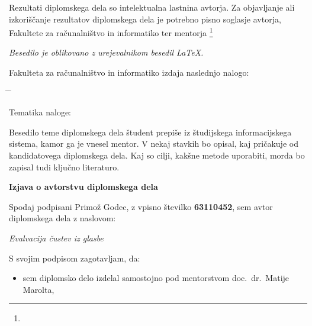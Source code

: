 \documentclass[a4paper, 12pt]{book}
\newcommand{\clearemptydoublepage}{\newpage{\pagestyle{empty}\cleardoublepage}}
\begin{document}
\thispagestyle{empty}
\vspace*{8cm}
{\small \noindent
Rezultati diplomskega dela so intelektualna lastnina avtorja.
Za objavljanje ali izkoriščanje rezultatov di\-plom\-ske\-ga dela je potrebno pisno soglasje avtorja, Fakultete za ra\-ču\-nal\-niš\-tvo in
informatiko ter mentorja%
\footnote{}


\begin{center}
\mbox{}\vfill
\emph{Besedilo je oblikovano z urejevalnikom besedil \LaTeX.}
\end{center}
\clearemptydoublepage

\thispagestyle{empty}
\vspace*{4cm}

\noindent
Fakulteta za računalništvo in informatiko izdaja naslednjo nalogo:
\medskip
\begin{tabbing}
\hspace{32mm}\= \hspace{6cm} \= \kill




Tematika naloge:
\end{tabbing}
Besedilo teme diplomskega dela študent prepiše iz študijskega informacijskega sistema, kamor ga je vnesel mentor. V nekaj stavkih bo opisal, kaj pričakuje od kandidatovega diplomskega dela. Kaj so cilji, kakšne metode uporabiti, morda bo zapisal tudi ključno literaturo.
\vspace{15mm}






\vspace{2cm}

\clearemptydoublepage

\vspace*{1cm}
\begin{center}
{\Large \textbf{\sc Izjava o avtorstvu diplomskega dela}}
\end{center}

\vspace{1cm}
\noindent Spodaj podpisani Primož Godec,
z vpisno številko \textbf{63110452}, sem avtor  diplomskega dela z naslovom:

\vspace{0.5cm}
\emph{Evalvacija čustev iz glasbe}

\vspace{1.5cm}
\noindent S svojim podpisom zagotavljam, da:
\begin{itemize}
	\item sem diplomsko delo izdelal samostojno pod mentorstvom
		doc.\ dr.\ Matije Marolta,


\end{itemize}}
\end{document}

